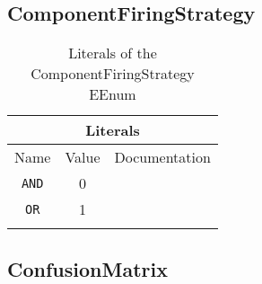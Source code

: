 \documentclass{article}
\begin{document}
\subsection[ComponentFiringStrategy]{ComponentFiringStrategy}
\label{e4smComponentFiringStrategy}

\begin{table}[H]
\footnotesize
\begin{tabularx}{\textwidth}{| c | c | X |}
\hline
\multicolumn{3}{|c|}{\textbf{Literals}} \\
\hline
Name & Value & Documentation \\ \hline \hline
\texttt{AND} & 0 &
 \\ \hline
\texttt{OR} & 1 &
 \\ \hline
\caption{Literals of the ComponentFiringStrategy EEnum}
\end{tabularx}
\label{e4smComponentFiringStrategylit}
\end{table}
\subsection[ConfusionMatrix]{ConfusionMatrix}
\label{e4smConfusionMatrix}
\end{document}
